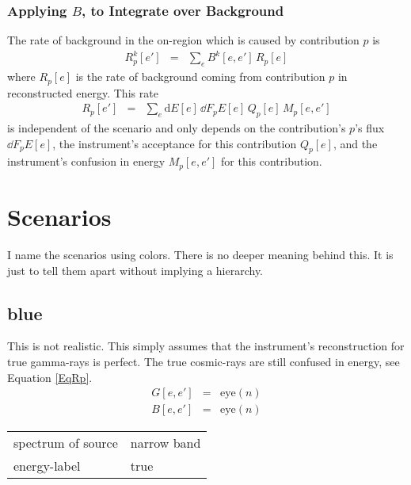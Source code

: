 \documentclass{article}%
\begin{document}
            \subsubsection*{Applying $B$, to Integrate over Background}
                The rate of background in the on-region which is caused by contribution $p$ is
                \begin{eqnarray}
                    R^k_p[e'] &=& \sum_{e} B^k[e, e'] \, R_p[e]
                \end{eqnarray}
                where $R_p[e]$ is the rate of background coming from contribution $p$ in reconstructed energy.
                This rate
                \begin{eqnarray}
                    R_p[e'] &=& \sum_{e} \text{d}E[e] \, \dd{F_p}{E}[e] \, Q_p[e] \, M_p[e, e']
                    \label{EqRp}
                \end{eqnarray}
                 is independent of the scenario and only depends on the contribution's $p$'s flux $\dd{F_p}{E}[e]$, the instrument's acceptance for this contribution $Q_p[e]$, and the instrument's confusion in energy $M_p[e, e']$ for this contribution.
    \section{Scenarios}
        I name the scenarios using colors. There is no deeper meaning behind this. It is just to tell them apart without implying a hierarchy.
        \subsection{blue}
            This is not realistic. This simply assumes that the instrument's reconstruction for true gamma-rays is perfect.
            The true cosmic-rays are still confused in energy, see Equation \ref{EqRp}.
            \begin{eqnarray}
                G[e, e'] &=& \mathrm{eye}(n)
                \\
                B[e, e'] &=& \mathrm{eye}(n)
            \end{eqnarray}
            \begin{center}
                \begin{tabular}{ll}
                    spectrum of source & narrow band\\
                    energy-label & true\\
                \end{tabular}
            \end{center}
\end{document}
